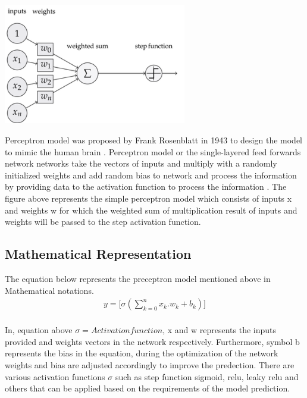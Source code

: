 
\begin{center}
    \includegraphics[width=0.6\textwidth]{Images/p_model.png} \\
\end{center}
\vspace{2mm}
Perceptron model was proposed by Frank Rosenblatt in 1943 to design the model to 
mimic the human brain \citep{939589}. Perceptron model or the single-layered feed forwards network 
networks take the vectors of inputs and multiply with a randomly 
initialized weights and add random bias to network and process the information by providing data to the
activation function to process the information \citep{AGATONOVICKUSTRIN2000717}.
The figure above represents the simple perceptron model which consists of inputs x and weights w 
for which the weighted sum of multiplication result of 
inputs and weights will be passed to the step activation function.

\subsection{Mathematical Representation }
\vspace{3mm}
{The equation below represents the preceptron model mentioned above in Mathematical notations.}
\begin{equation}
    \begin{split}
        y = \Big[\sigma(\sum_{k=0}^n x_k.w_k + b_k)\Big] \\
    \end{split}
\end{equation}

     {
        In, equation above ${\sigma = Activation function}$, x and w represents the inputs provided 
        and weights vectors in the network respectively. Furthermore, symbol b represents the bias in the equation, 
        during the optimization of the network weights and bias are adjusted accordingly to improve the predection. There are various activation functions ${\sigma}$ such as step function sigmoid, 
        relu, leaky relu and others that can be applied based on the requirements of the model prediction.
    }
